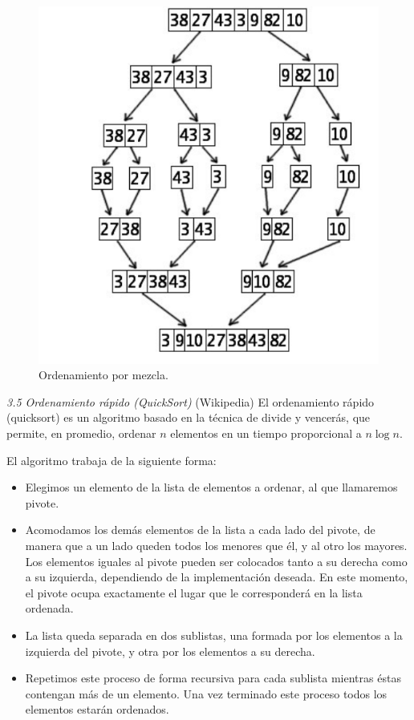 \documentclass[twoside,10.5pt]{article}%
\begin{document}
\begin{figure}[h]
   \centering
   \includegraphics[scale=.35]{merge.png}
   \caption{Ordenamiento por mezcla.} 
  \end{figure}

\emph{3.5   Ordenamiento r\'apido   (QuickSort)}
(Wikipedia) El ordenamiento r\'apido (quicksort) es un algoritmo  basado en la t\'ecnica de divide y vencer\'as, que permite, en promedio, ordenar $n$ elementos en un tiempo proporcional a $n\log n$.

El algoritmo trabaja de la siguiente forma:

\begin{itemize}
\item Elegimos un elemento de la lista de elementos a ordenar, al que llamaremos pivote.
\item Acomodamos  los dem\'as elementos de la lista a cada lado del pivote, de manera que a un lado queden todos los menores que \'el, y al otro los mayores. Los elementos iguales al pivote pueden ser colocados tanto a su derecha como a su izquierda, dependiendo de la implementaci\'on deseada. En este momento, el pivote ocupa exactamente el lugar que le corresponderá en la lista ordenada.
\item La lista queda separada en dos sublistas, una formada por los elementos a la izquierda del pivote, y otra por los elementos a su derecha.
\item Repetimos este proceso de forma recursiva para cada sublista mientras \'estas contengan m\'as de un elemento. Una vez terminado este proceso todos los elementos estar\'an ordenados.
\end{itemize}
\end{document}
